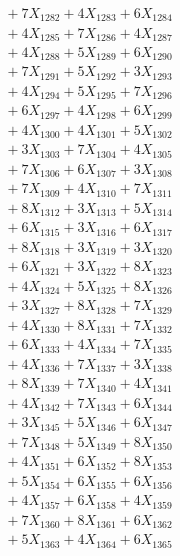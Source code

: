 \documentclass[a4paper,10pt]{article}
\begin{document}
{\begin{align}
&\;  + 7 X_{1282} + 4 X_{1283} + 6 X_{1284} \\[0.3ex]
&\;  + 4 X_{1285} + 7 X_{1286} + 4 X_{1287} \\[0.3ex]
&\;  + 4 X_{1288} + 5 X_{1289} + 6 X_{1290} \\[0.3ex]
&\;  + 7 X_{1291} + 5 X_{1292} + 3 X_{1293} \\[0.3ex]
&\;  + 4 X_{1294} + 5 X_{1295} + 7 X_{1296} \\[0.3ex]
&\;  + 6 X_{1297} + 4 X_{1298} + 6 X_{1299} \\[0.5ex]\allowbreak
&\;  + 4 X_{1300} + 4 X_{1301} + 5 X_{1302} \\[0.3ex]
&\;  + 3 X_{1303} + 7 X_{1304} + 4 X_{1305} \\[0.3ex]
&\;  + 7 X_{1306} + 6 X_{1307} + 3 X_{1308} \\[0.3ex]
&\;  + 7 X_{1309} + 4 X_{1310} + 7 X_{1311} \\[0.3ex]
&\;  + 8 X_{1312} + 3 X_{1313} + 5 X_{1314} \\[0.3ex]
&\;  + 6 X_{1315} + 3 X_{1316} + 6 X_{1317} \\[0.3ex]
&\;  + 8 X_{1318} + 3 X_{1319} + 3 X_{1320} \\[0.3ex]
&\;  + 6 X_{1321} + 3 X_{1322} + 8 X_{1323} \\[0.3ex]
&\;  + 4 X_{1324} + 5 X_{1325} + 8 X_{1326} \\[0.3ex]
&\;  + 3 X_{1327} + 8 X_{1328} + 7 X_{1329} \\[0.5ex]\allowbreak
&\;  + 4 X_{1330} + 8 X_{1331} + 7 X_{1332} \\[0.3ex]
&\;  + 6 X_{1333} + 4 X_{1334} + 7 X_{1335} \\[0.3ex]
&\;  + 4 X_{1336} + 7 X_{1337} + 3 X_{1338} \\[0.3ex]
&\;  + 8 X_{1339} + 7 X_{1340} + 4 X_{1341} \\[0.3ex]
&\;  + 4 X_{1342} + 7 X_{1343} + 6 X_{1344} \\[0.3ex]
&\;  + 3 X_{1345} + 5 X_{1346} + 6 X_{1347} \\[0.3ex]
&\;  + 7 X_{1348} + 5 X_{1349} + 8 X_{1350} \\[0.3ex]
&\;  + 4 X_{1351} + 6 X_{1352} + 8 X_{1353} \\[0.3ex]
&\;  + 5 X_{1354} + 6 X_{1355} + 6 X_{1356} \\[0.3ex]
&\;  + 4 X_{1357} + 6 X_{1358} + 4 X_{1359} \\[0.5ex]\allowbreak
&\;  + 7 X_{1360} + 8 X_{1361} + 6 X_{1362} \\[0.3ex]
&\;  + 5 X_{1363} + 4 X_{1364} + 6 X_{1365} \\[0.3ex]

\end{align}}
\end{document}
